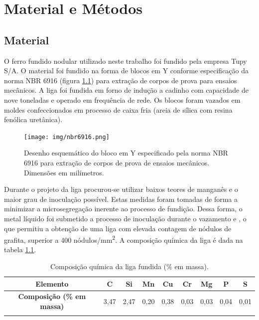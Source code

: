 \chapter{Material e M\'{e}todos}

\section{Material}

O ferro fundido nodular utilizado neste trabalho foi fundido pela empresa Tupy S/A. O material foi fundido na forma de blocos em Y conforme especificação da norma NBR 6916 (figura \ref{fig:nbr6916}) para extração de corpos de prova para ensaios mecânicos. A liga foi fundida em forno de indução a cadinho com capacidade de nove toneladas e operado em frequência de rede. Os blocos foram vazados em moldes confeccionados em processo de caixa fria (areia de sílica com resina fenólica uretânica).

\begin{figure}
	\texttt{[image: img/nbr6916.png]}
	\caption{Desenho esquemático do bloco em Y especificado pela norma NBR 6916 para extração de corpos de prova de ensaios mecânicos. Dimensões em milímetros.}
	\label{fig:nbr6916}
\end{figure}

Durante o projeto da liga procurou-se utilizar baixos teores de manganês e o maior grau de inoculação possível. Estas medidas foram tomadas de forma a minimizar a microsegregação inerente ao processo de fundição. Dessa forma, o metal líquido foi submetido a processo de inoculação durante o vazamento e , o que permitiu a obtenção de uma liga com elevada contagem de nódulos de grafita, superior a 400 nódulos/mm\textsuperscript{2}. A composição química da liga é dada na tabela \ref{tab:CQ}. %

\begin{table}
	\caption{Composição química da liga fundida (\% em massa).}
	\begin{tabular}{c c c c c c c c c}
	\thickhline
	\textbf{Elemento} & C & Si & Mn & Cu & Cr & Mg & P & S \\
	\hline
	\textbf{Composição (\% em massa)} & 3,47 & 2,47 & 0,20 & 0,38 & 0,03 & 0,03 & 0,04 & 0,01 \\
	\thickhline
	\end{tabular}
	\label{tab:CQ}
\end{table}

